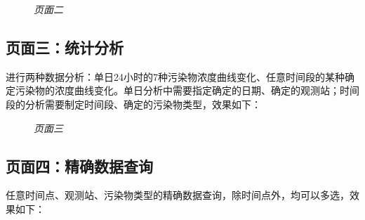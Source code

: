 ﻿\documentclass{article}
\begin{document}
\begin{CJK*}{GBK}{song}
\begin{figure}[ht]
\centering
{}
\caption{\textit{页面二}}
\end{figure}


\subsection{页面三：统计分析}
\qquad 进行两种数据分析：单日24小时的7种污染物浓度曲线变化、任意时间段的某种确定污染物的浓度曲线变化。单日分析中需要指定确定的日期、确定的观测站；时间段的分析需要制定时间段、确定的污染物类型，效果如下：

\begin{figure}[ht]
\centering
{}
\caption{\textit{页面三}}
\end{figure}

\subsection{页面四：精确数据查询}
\qquad 任意时间点、观测站、污染物类型的精确数据查询，除时间点外，均可以多选，效果如下：


\end{CJK*}
\end{document}
